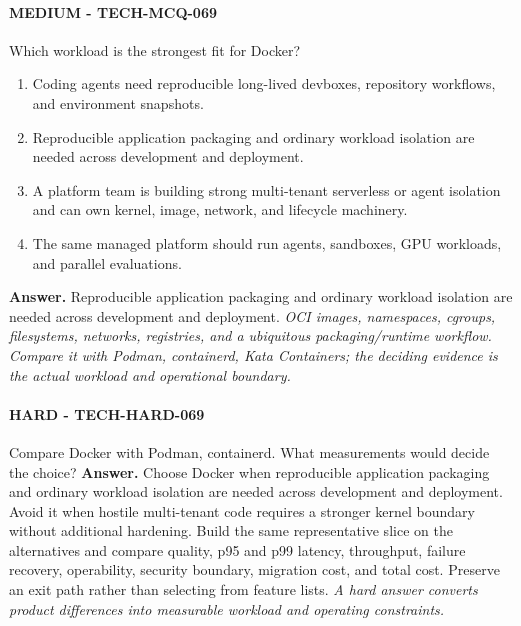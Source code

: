 \paragraph{MEDIUM - TECH-MCQ-069} Which workload is the strongest fit for Docker?
\begin{enumerate}[label=\Alph*.]
\item Coding agents need reproducible long-lived devboxes, repository workflows, and environment snapshots.
\item Reproducible application packaging and ordinary workload isolation are needed across development and deployment.
\item A platform team is building strong multi-tenant serverless or agent isolation and can own kernel, image, network, and lifecycle machinery.
\item The same managed platform should run agents, sandboxes, GPU workloads, and parallel evaluations.
\end{enumerate}
\textbf{Answer.} Reproducible application packaging and ordinary workload isolation are needed across development and deployment.
\textit{OCI images, namespaces, cgroups, filesystems, networks, registries, and a ubiquitous packaging/runtime workflow. Compare it with Podman, containerd, Kata Containers; the deciding evidence is the actual workload and operational boundary.}
\paragraph{HARD - TECH-HARD-069} Compare Docker with Podman, containerd. What measurements would decide the choice?
\textbf{Answer.} Choose Docker when reproducible application packaging and ordinary workload isolation are needed across development and deployment. Avoid it when hostile multi-tenant code requires a stronger kernel boundary without additional hardening. Build the same representative slice on the alternatives and compare quality, p95 and p99 latency, throughput, failure recovery, operability, security boundary, migration cost, and total cost. Preserve an exit path rather than selecting from feature lists.
\textit{A hard answer converts product differences into measurable workload and operating constraints.}
